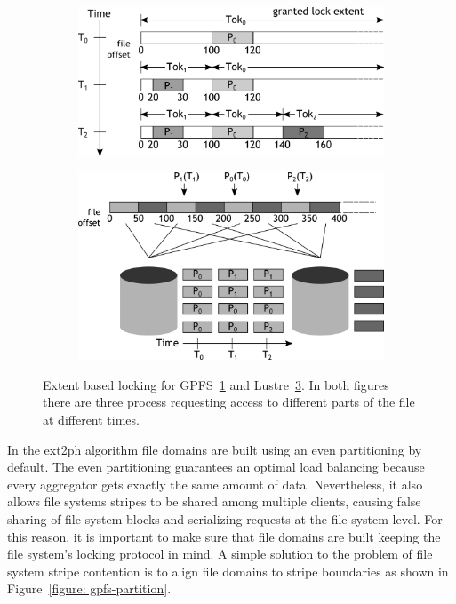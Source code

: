 \begin{figure}[!htb]
  \centering
  \begin{subfigure}[t]{0.6\textwidth}
  \includegraphics[width=\textwidth]{figures/gpfs-lock}
  \caption{}
  \label{figure: gpfs-lock}
  \end{subfigure}
  \begin{subfigure}[t]{0.6\textwidth}
  \includegraphics[width=\textwidth]{figures/lustre-lock}
  \caption{}
  \label{figure: lustre-lock}
  \end{subfigure}
  \caption{Extent based locking for GPFS~\ref{figure: gpfs-lock} and Lustre~\ref{figure: lustre-lock}. In both figures there are three process requesting access to different parts of the file
  at different times.}
\end{figure}

In the ext2ph algorithm file domains are built using an even partitioning by default. The even partitioning guarantees an optimal load balancing because every aggregator gets exactly the same
amount of data. Nevertheless, it also allows file systems stripes to be shared among multiple clients, causing false sharing of file system blocks and serializing requests at the file system level.
For this reason, it is important to make sure that file domains are built keeping the file system's locking protocol in mind. A simple solution to the problem of file system stripe contention is to
align file domains to stripe boundaries as shown in Figure~\ref{figure: gpfs-partition}.

